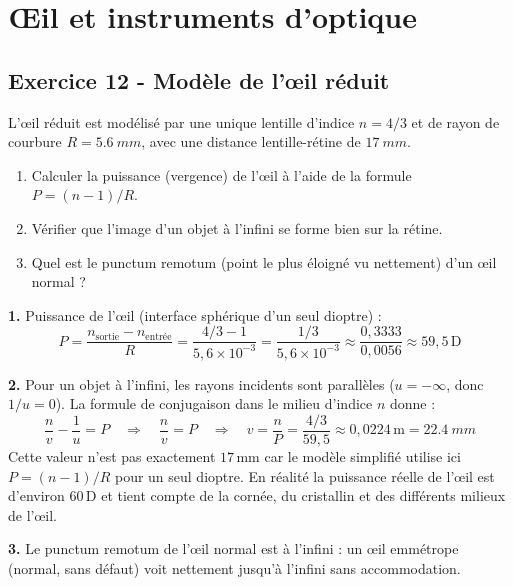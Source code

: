\documentclass[12pt,a4paper]{article}
\begin{document}
\newpage
\section{\OE{}il et instruments d'optique}

\subsection*{Exercice 12 - Modèle de l'\oe{}il réduit \niveau{\moyen}}

\begin{boiteexercice}
L'\oe{}il réduit est modélisé par une unique lentille d'indice $n = 4/3$ et de rayon de courbure $R = \qty{5.6}{mm}$, avec une distance lentille-rétine de $\qty{17}{mm}$.
\begin{enumerate}
  \item Calculer la puissance (vergence) de l'\oe{}il à l'aide de la formule $P = (n-1)/R$.
  \item Vérifier que l'image d'un objet à l'infini se forme bien sur la rétine.
  \item Quel est le punctum remotum (point le plus éloigné vu nettement) d'un \oe{}il normal ?
\end{enumerate}
\end{boiteexercice}

\begin{boitecorrige}
\textbf{1.} Puissance de l'\oe{}il (interface sphérique d'un seul dioptre) :
\[
P = \frac{n_{\text{sortie}} - n_{\text{entrée}}}{R} = \frac{4/3 - 1}{5{,}6\times10^{-3}} = \frac{1/3}{5{,}6\times10^{-3}} \approx \frac{0{,}3333}{0{,}0056} \approx 59{,}5\,\text{D}
\]

\textbf{2.} Pour un objet à l'infini, les rayons incidents sont parallèles ($u = -\infty$, donc $1/u = 0$). La formule de conjugaison dans le milieu d'indice $n$ donne :
\[
\frac{n}{v} - \frac{1}{u} = P \quad \Rightarrow \quad \frac{n}{v} = P \quad \Rightarrow \quad v = \frac{n}{P} = \frac{4/3}{59{,}5} \approx 0{,}0224\,\text{m} = \qty{22.4}{mm}
\]
Cette valeur n'est pas exactement $17\,\text{mm}$ car le modèle simplifié utilise ici $P=(n-1)/R$ pour un seul dioptre. En réalité la puissance réelle de l'\oe{}il est d'environ $60\,\text{D}$ et tient compte de la cornée, du cristallin et des différents milieux de l'\oe{}il.

\textbf{3.} Le punctum remotum de l'\oe{}il normal est à l'infini : un \oe{}il emmétrope (normal, sans défaut) voit nettement jusqu'à l'infini sans accommodation.
\end{boitecorrige}
\end{document}
